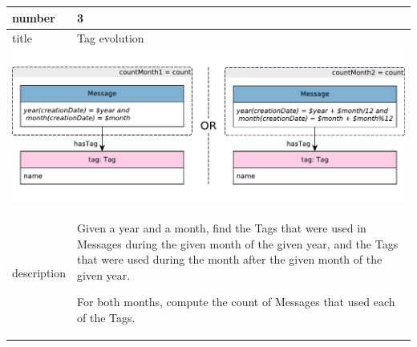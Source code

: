 \renewcommand*{\arraystretch}{1.1}

\noindent\begin{tabularx}{17cm}{|p{1.95cm}|X|}
	\hline
	number      & 3                                                          \\ \hline
%
	title       & Tag evolution                                                           \\ \hline
	\multicolumn{2}{|c|}{ \includegraphics[scale=\patternscale,margin=0cm .2cm]{patterns/q03}} \\ \hline
	description & Given a year and a month, find the Tags that were used in Messages
during the given month of the given year, and the Tags that were used
during the month after the given month of the given year.

For both months, compute the count of Messages that used each of the
Tags.
 \\ \hline
	

\end{tabularx}
